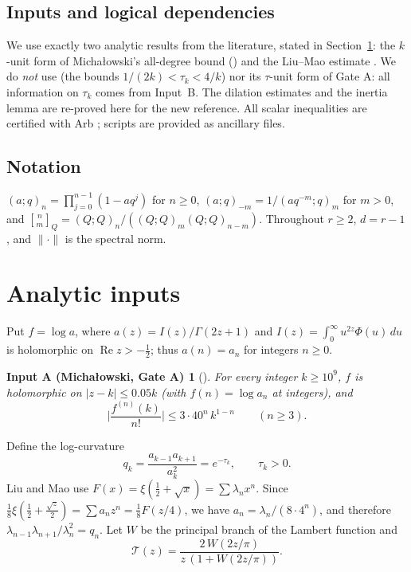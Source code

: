 \documentclass[11pt,a4paper]{article}
\numberwithin{equation}{section}
\newtheorem*{inputA}{Input A (Michałowski, Gate A)}
\theoremstyle{definition}
\theoremstyle{remark}
\newcommand{\cT}{\mathcal T}
\newcommand{\qbin}[3]{\genfrac{[}{]}{0pt}{}{#1}{#2}_{#3}}
\begin{document}
\subsection{Inputs and logical dependencies}
We use exactly two analytic results from the literature, stated in Section~\ref{sec:inputs}:
the $k$-unit form of Michałowski's all-degree bound (\cite[Prop.~3.7, first display]{Mich}) and
the Liu--Mao estimate \cite[Lemma~3.3]{LM}. We do \emph{not} use \cite[Lemma~2.1]{Mich} (the bounds
$1/(2k)<\tau_k<4/k$) nor its $\tau$-unit form of Gate A: all information on $\tau_k$ comes from Input~B.
The dilation estimates and the inertia lemma are re-proved here for the new reference.
All scalar inequalities are certified with Arb \cite{Arb}; scripts are provided as ancillary files.

\subsection*{Notation}
$(a;q)_n=\prod_{j=0}^{n-1}(1-aq^j)$ for $n\ge0$, $(a;q)_{-m}=1/(aq^{-m};q)_m$ for $m>0$, and
$\qbin nm{Q}=(Q;Q)_n/((Q;Q)_m(Q;Q)_{n-m})$. Throughout $r\ge2$, $d=r-1$, and $\|\cdot\|$ is the spectral norm.

\section{Analytic inputs}\label{sec:inputs}

Put $f=\log a$, where $a(z)=I(z)/\Gamma(2z+1)$ and $I(z)=\int_0^\infty u^{2z}\Phi(u)\,du$ is holomorphic on
$\operatorname{Re}z>-\tfrac12$; thus $a(n)=a_n$ for integers $n\ge0$.

\begin{inputA}[{\cite[Lemma~3.6, Prop.~3.7]{Mich}}]
For every integer $k\ge10^9$, $f$ is holomorphic on $|z-k|\le0.05k$ (with $f(n)=\log a_n$ at integers), and
\begin{equation}\label{eq:gateA}
\Big|\frac{f^{(n)}(k)}{n!}\Big|\le 3\cdot40^n\,k^{1-n}\qquad(n\ge3).
\end{equation}
\end{inputA}

Define the log-curvature
\[
q_k=\frac{a_{k-1}a_{k+1}}{a_k^2}=e^{-\tau_k},\qquad \tau_k>0 .
\]
Liu and Mao use $F(x)=\xi(\tfrac12+\sqrt x)=\sum\lambda_nx^n$. Since $\tfrac18\xi(\tfrac12+\tfrac{\sqrt z}{2})=\sum a_nz^n=\tfrac18F(z/4)$,
we have $a_n=\lambda_n/(8\cdot4^n)$, and therefore $\lambda_{n-1}\lambda_{n+1}/\lambda_n^2=q_n$.
Let $W$ be the principal branch of the Lambert function and
\[
\cT(z)=\frac{2\,W(2z/\pi)}{z\,(1+W(2z/\pi))}.
\]
\end{document}
